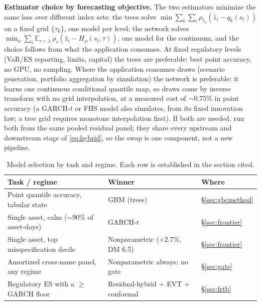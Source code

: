 \documentclass[11pt]{article}
\theoremstyle{remark}
\begin{document}
\noindent\textbf{Estimator choice by forecasting objective.} The two estimators
minimize the same loss over different index sets: the trees solve
$\min \sum_{k}\sum_{i}\rho_{\tau_k}(\widehat{z}_i - q_k(s_i))$ on a
fixed grid $\{\tau_k\}$, one model per level; the network solves
$\min_\phi \sum_i \mathbb{E}_{\tau\sim\lambda}\,
\rho_\tau(\widehat{z}_i - H_\phi(s_i,\tau))$, one model for the continuum, and the choice follows from what the application consumes.
At fixed regulatory levels (VaR/ES
reporting, limits, capital) the trees are preferable: best point accuracy, no
GPU, no sampling. Where the application consumes draws (scenario generation, portfolio aggregation by simulation) the network is preferable: it learns one continuous conditional quantile map, so
draws come by inverse transform with no grid interpolation, at a
measured cost of $\sim$0.75\% in point accuracy (a GARCH-$t$ or FHS
model also simulates, from its fixed innovation law; a tree grid
requires monotone interpolation first). If both are needed,
run both from the same pooled residual panel; they share every upstream
and downstream stage of \eqref{eq:hybrid}, so the swap is one component,
not a new pipeline.

\medskip\noindent{}

\begin{table}[t]
\centering\small
\caption{Model selection by task and regime.
Each row is established in the section cited.}
\label{tab:decision}
\begin{tabular}{p{}p{}l}
\toprule
Task / regime & Winner & Where \\
\midrule
Point quantile accuracy, tabular state & GBM (trees) & \S\ref{sec:gbcmethod} \\
Single asset, calm ($\sim$90\% of asset-days) & GARCH-$t$ & \S\ref{sec:frontier} \\
Single asset, top misspecification decile & Nonparametric ($+2.7\%$, DM 6.5) & \S\ref{sec:frontier} \\
Amortized cross-name panel, any regime & Nonparametric always; no gate & \S\ref{sec:gate} \\
Regulatory ES with a $\ge$GARCH floor & Residual-hybrid $+$ EVT $+$ conformal & \S\ref{sec:frtb} \\
\bottomrule
\end{tabular}
\end{table}
\end{document}
